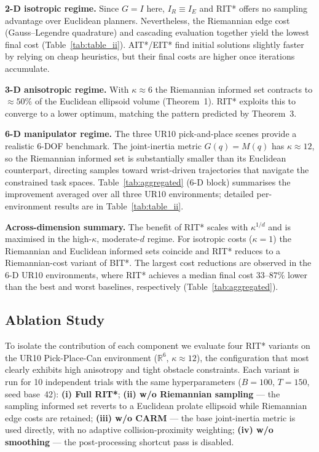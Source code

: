 \documentclass[journal]{IEEEtran}
\newcommand{\IR}{I_{\!R}}
\newcommand{\IE}{I_{\!E}}
\begin{document}
\textbf{2-D isotropic regime.}
Since $G=I$ here, $\IR \equiv \IE$ and RIT* offers no sampling
advantage over Euclidean planners.
Nevertheless, the Riemannian edge cost (Gauss--Legendre quadrature)
and cascading evaluation together yield the lowest final cost
(Table~\ref{tab:table_ii}).
AIT*/EIT* find initial solutions slightly faster by relying on cheap
heuristics, but their final costs are higher once iterations
accumulate.

\textbf{3-D anisotropic regime.}
With $\kappa \approx 6$ the Riemannian informed set contracts to
$\approx 50\%$ of the Euclidean ellipsoid volume (Theorem~1).
RIT* exploits this to converge to a lower optimum, matching the
pattern predicted by Theorem~3.

\textbf{6-D manipulator regime.}
The three UR10 pick-and-place scenes provide a realistic 6-DOF
benchmark.
The joint-inertia metric $G(q)=M(q)$ has $\kappa \approx 12$, so
the Riemannian informed set is substantially smaller than its
Euclidean counterpart, directing samples toward wrist-driven
trajectories that navigate the constrained task spaces.
Table~\ref{tab:aggregated} (6-D block) summarises the
improvement averaged over all three UR10 environments; detailed
per-environment results are in Table~\ref{tab:table_ii}.

\textbf{Across-dimension summary.}
The benefit of RIT* scales with $\kappa^{1/d}$ and is maximised in
the high-$\kappa$, moderate-$d$ regime.
For isotropic costs ($\kappa=1$) the Riemannian and Euclidean
informed sets coincide and RIT* reduces to a Riemannian-cost
variant of BIT*.
The largest cost reductions are observed in the 6-D UR10 environments,
where RIT* achieves a median final cost $33$--$87\%$ lower than the
best and worst baselines, respectively
(Table~\ref{tab:aggregated}).


\subsection{Ablation Study}\label{sec:ablation}

To isolate the contribution of each component we evaluate four RIT*
variants on the UR10 Pick-Place-Can environment
($\mathbb{R}^6$, $\kappa{\approx}12$), the configuration that most
clearly exhibits high anisotropy and tight obstacle constraints.
Each variant is run for 10 independent trials with the same
hyperparameters ($B{=}100$, $T{=}150$, seed base~42):
\textbf{(i) Full RIT*};
\textbf{(ii) w/o Riemannian sampling} --- the sampling informed set
reverts to a Euclidean prolate ellipsoid while Riemannian edge costs
are retained;
\textbf{(iii) w/o CARM} --- the base joint-inertia metric is used
directly, with no adaptive collision-proximity weighting;
\textbf{(iv) w/o smoothing} --- the post-processing shortcut
pass is disabled.
\end{document}
